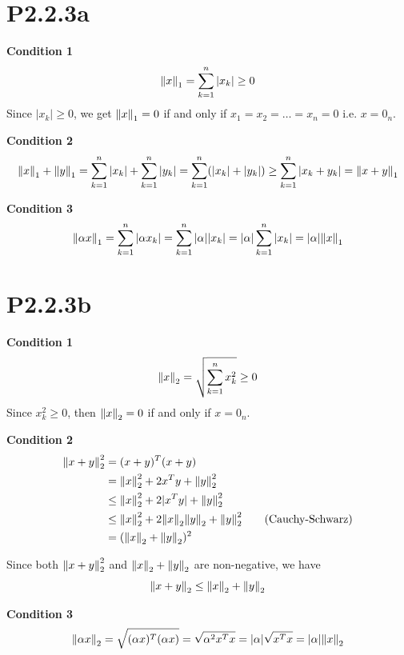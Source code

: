 \documentclass{article}
\begin{document}
\section*{P2.2.3a}
\textbf{Condition 1}
\begin{align*}
    \norm{x}_1 = \sum_{k=1}^n |x_k| \ge 0
\end{align*}
Since $|x_k| \ge 0$, we get $\norm{x}_1=0$ if and only if $x_1=x_2=\dots=x_n=0$ i.e. $x=0_n$.

\textbf{Condition 2}
\begin{align*}
    \norm{x}_1 + \norm{y}_1 =\sum_{k=1}^n |x_k|+\sum_{k=1}^n |y_k| = \sum_{k=1}^n (|x_k|+|y_k|) \ge \sum_{k=1}^n |x_k+y_k| =\norm{x+y}_1
\end{align*}

\textbf{Condition 3}
\begin{align*}
    \norm{\alpha x}_1 = \sum_{k=1}^n |\alpha x_k| = \sum_{k=1}^n |\alpha||x_k| = |\alpha|\sum_{k=1}^n |x_k| = |\alpha|\norm{x}_1
\end{align*}

\section*{P2.2.3b}
\textbf{Condition 1}
\begin{align*}
    \norm{x}_2 = \sqrt{\sum_{k=1}^n x_k^2} \ge 0
\end{align*}
Since $x_k^2 \ge 0$, then $\norm{x}_2 =0$ if and only if $x=0_n$.

\textbf{Condition 2}
\begin{align*}
    \norm{x+y}_2^2
     & = (x+y)^T(x+y)                                                              \\
     & = \norm{x}_2^2+2x^Ty+\norm{y}^2_2                                           \\
     & \le \norm{x}_2^2+2|x^Ty|+\norm{y}^2_2                                       \\
     & \le \norm{x}_2^2+2\norm{x}_2\norm{y}_2+\norm{y}^2_2 \tag*{(Cauchy-Schwarz)} \\
     & = (\norm{x}_2+\norm{y}_2)^2
\end{align*}

Since both $\norm{x+y}_2^2$ and $\norm{x}_2+\norm{y}_2$ are non-negative, we have
\[
    \norm{x+y}_2 \le \norm{x}_2+\norm{y}_2
\]

\textbf{Condition 3}
\begin{align*}
    \norm{\alpha x}_2 = \sqrt{(\alpha x)^T(\alpha x)}=\sqrt{\alpha^2 x^Tx} =|\alpha|\sqrt{x^Tx}=|\alpha|\norm{x}_2
\end{align*}
\end{document}
